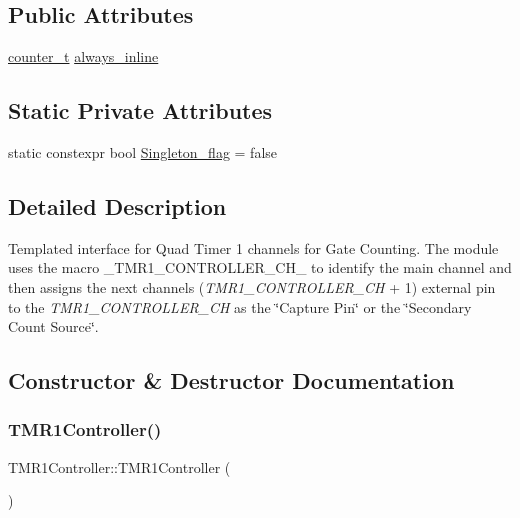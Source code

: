 \subsection*{Public Attributes}
\begin{DoxyCompactItemize}
\item 
\hyperlink{types_8hpp_a22f279793847eba127de149437848c48}{counter\+\_\+t} \hyperlink{classTMR1Controller_adce8e8a496510485a88ccc5b88595672}{always\+\_\+inline}
\end{DoxyCompactItemize}
\subsection*{Static Private Attributes}
\begin{DoxyCompactItemize}
\item 
static constexpr bool \hyperlink{classTMR1Controller_a532b729ca9a7c28e5f4d221f80487241}{Singleton\+\_\+flag} = false
\end{DoxyCompactItemize}


\subsection{Detailed Description}
Templated interface for Quad Timer 1 channels for Gate Counting. The module uses the macro {\ttfamily \+\_\+\+T\+M\+R1\+\_\+\+C\+O\+N\+T\+R\+O\+L\+L\+E\+R\+\_\+\+C\+H\+\_\+} to identify the main channel and then assigns the next channel\textquotesingle{}s ({\itshape T\+M\+R1\+\_\+\+C\+O\+N\+T\+R\+O\+L\+L\+E\+R\+\_\+\+CH} + 1) external pin to the {\itshape T\+M\+R1\+\_\+\+C\+O\+N\+T\+R\+O\+L\+L\+E\+R\+\_\+\+CH} as the \char`\"{}\+Capture Pin\char`\"{} or the \char`\"{}\+Secondary Count Source\char`\"{}. 

\subsection{Constructor \& Destructor Documentation}
\mbox{\label{classTMR1Controller_aebc677e795f673c6520d5a03eb6aa4f2}} 
\subsubsection{\texorpdfstring{T\+M\+R1\+Controller()}{TMR1Controller()}}
{\footnotesize\ttfamily T\+M\+R1\+Controller\+::\+T\+M\+R1\+Controller (\begin{DoxyParamCaption}{ }\end{DoxyParamCaption})\hspace{0.3cm}{\ttfamily [inline]}}



